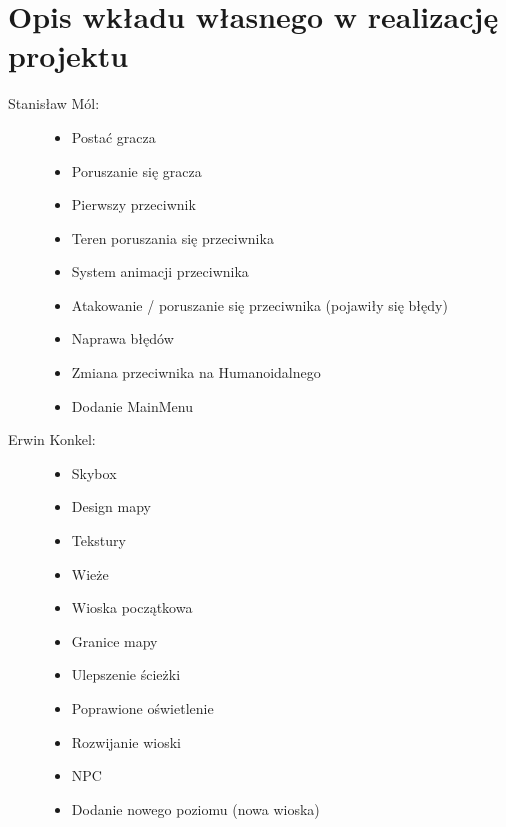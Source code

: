 \documentclass[10pt,a4paper]{article}
\begin{document}
\section{Opis wkładu własnego w realizację projektu}
\vspace{0.5cm}
\begin{description}
  \item[Stanisław Mól:] \hfill
  	\begin{itemize}
 	  \item Postać gracza
 	  \item Poruszanie się gracza
	  \item Pierwszy przeciwnik
	  \item Teren poruszania się przeciwnika
	  \item System animacji przeciwnika
	  \item Atakowanie / poruszanie się przeciwnika (pojawiły się błędy)
	  \item Naprawa błędów
	  \item Zmiana przeciwnika na Humanoidalnego
	  \item Dodanie MainMenu
	\end{itemize}
  \item[ Erwin Konkel:] \hfill
  	\begin{itemize}
          \item Skybox
  	  \item Design mapy
 	  \item Tekstury
  	  \item Wieże
	  \item Wioska początkowa
 	  \item Granice mapy
  	  \item Ulepszenie ścieżki 
  	  \item Poprawione oświetlenie
	  \item Rozwijanie wioski
	  \item NPC
	  \item Dodanie nowego poziomu (nowa wioska)
	\end{itemize}
\end{description}
\end{document}
